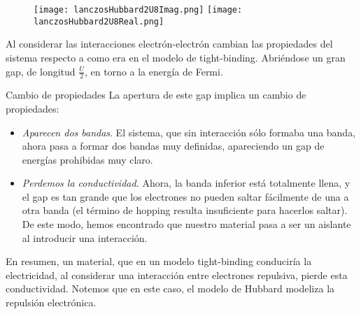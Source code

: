 \documentclass{beamer}
\begin{document}
\begin{frame}
    \begin{figure}
        \begin{center}
            \texttt{[image: lanczosHubbard2U8Imag.png]}
            \texttt{[image: lanczosHubbard2U8Real.png]}
        \end{center}
    \end{figure}
\end{frame}
\begin{frame}
    Al considerar las interacciones electrón-electrón cambian las propiedades del sistema respecto a como era en el modelo de tight-binding. Abriéndose un gran gap, de longitud $\frac{U}{2}$, en torno a la energía de Fermi.
    \begin{block}{Cambio de propiedades}
        La apertura de este gap implica un cambio de propiedades:
        \begin{itemize}
            \item \textit{Aparecen dos bandas}. El sistema, que sin interacción sólo formaba una banda, ahora pasa a formar dos bandas muy definidas, apareciendo un gap de energías prohibidas muy claro.
            \item \textit{Perdemos la conductividad.} Ahora, la banda inferior está totalmente llena, y el gap es tan grande que los electrones no pueden saltar fácilmente de una a otra banda (el término de hopping resulta insuficiente para hacerlos saltar). De este modo, hemos encontrado que nuestro material pasa a ser un aislante al introducir una interacción.
        \end{itemize}
    \end{block}
    En resumen, un material, que en un modelo tight-binding conduciría la electricidad, al considerar una interacción entre electrones repulsiva, pierde esta conductividad. Notemos que en este caso, el modelo de Hubbard modeliza la repulsión electrónica.
\end{frame}
\end{document}
